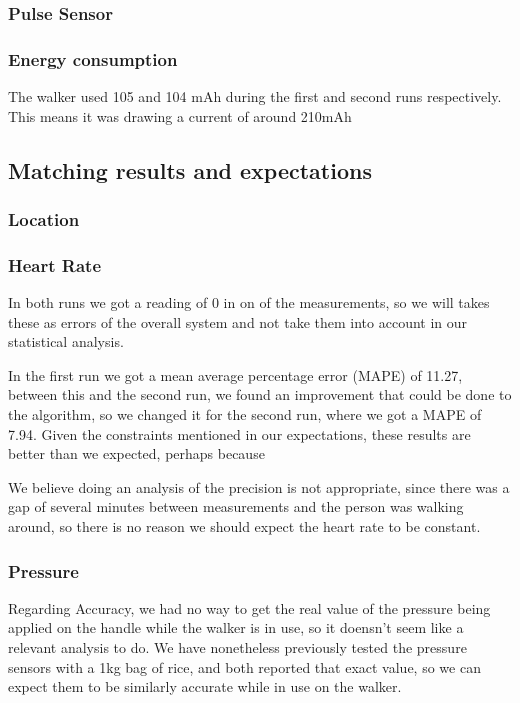 		\subsubsection{Pulse Sensor}

		\subsubsection{Energy consumption}
			The walker used 105 and 104 mAh during the first and second runs respectively. This means it was drawing a current of around 210mAh
	\subsection{Matching results and expectations}
		\subsubsection{Location}

		\subsubsection{Heart Rate}
			In both runs we got a reading of 0 in on of the measurements, so we will takes these as errors of the overall system and not take them into account in our statistical analysis.

			In the first run we got a mean average percentage error (MAPE) of 11.27, between this and the second run, we found an improvement that could be done to the algorithm, so we changed it for the second run, where we got a MAPE of 7.94. Given the constraints mentioned in our expectations, these results are better than we expected, perhaps because %

			We believe doing an analysis of the precision is not appropriate, since there was a gap of several minutes between measurements and the person was walking around, so there is no reason we should expect the heart rate to be constant.

		\subsubsection{Pressure}
			Regarding Accuracy, we had no way to get the real value of the pressure being applied on the handle while the walker is in use, so it doensn't seem like a relevant analysis to do. We have nonetheless previously tested the pressure sensors with a 1kg bag of rice, and both reported that exact value, so we can expect them to be similarly accurate while in use on the walker.

